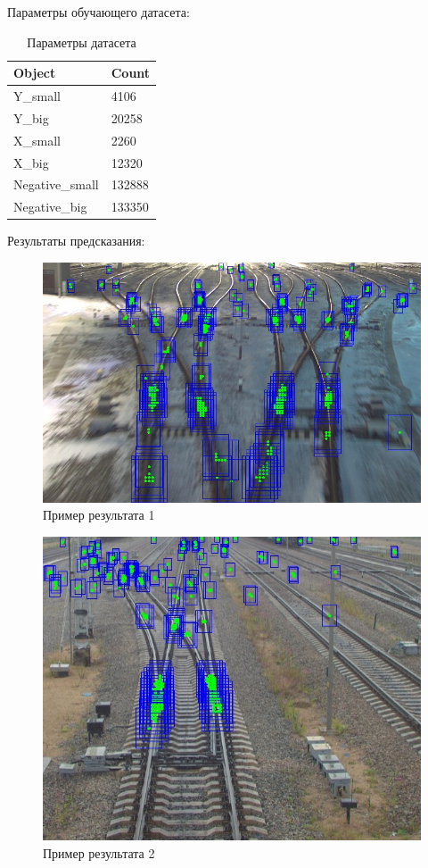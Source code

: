 Параметры обучающего датасета:
\begin{table}[!h]
	\begin{tabular}{|l|l|}
		\hline
		\textbf{Object} & \textbf{Count} \\ \hline
		Y\_small        & 4106           \\ \hline
		Y\_big          & 20258          \\ \hline
		X\_small        & 2260           \\ \hline
		X\_big          & 12320          \\ \hline
		Negative\_small & 132888         \\ \hline
		Negative\_big   & 133350         \\ \hline
	\end{tabular}
	\label{tab:params3}
	\caption{Параметры датасета}
\end{table}

Результаты предсказания:
\begin{figure}[!h]
	\centering
	\includegraphics[width=0.8\linewidth]{pictures/screenshot2326}
	\caption{Пример результата 1}
	\label{fig:screenshot2326}
\end{figure}
\begin{figure}[h!]
	\centering
	\includegraphics[width=0.8\linewidth]{pictures/screenshot2327}
	\caption{Пример результата 2}
	\label{fig:screenshot2327}
\end{figure}\newpage

